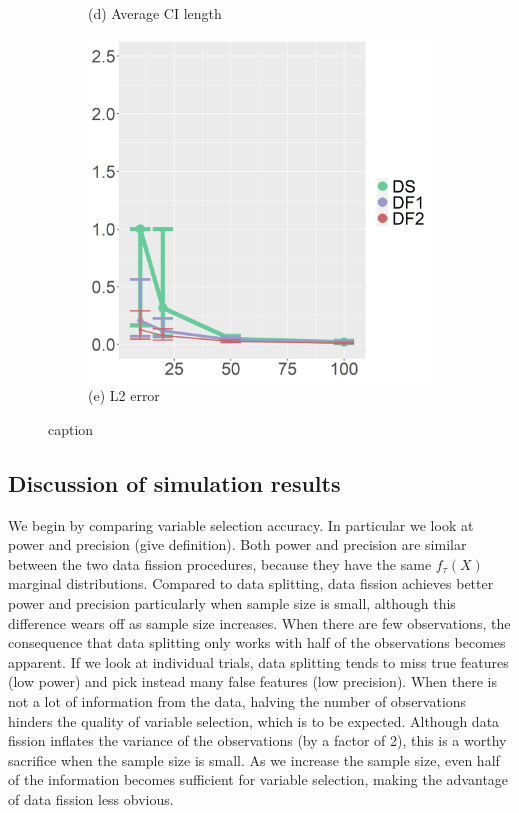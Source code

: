 \begin{figure}[ht!]
\begin{subfigure}[b]{.32\columnwidth}
    \caption{(d) Average CI length}
\end{subfigure}
\hfill
\centering
\begin{subfigure}[b]{.32\columnwidth} 
    \includegraphics[width=\columnwidth]{../../plot/L2_1.png}
    \caption{(e) L2 error}
\end{subfigure}
\hfill
\caption{caption}
\label{fig:median}
\end{figure}

\subsection{Discussion of simulation results}

We begin by comparing variable selection accuracy. In particular we look at power and precision (give definition). Both power and precision are similar between the two data fission procedures, because they have the same $f_\tau(X)$ marginal distributions. Compared to data splitting, data fission achieves better power and precision particularly when sample size is small, although this difference wears off as sample size increases. When there are few observations, the consequence that data splitting only works with half of the observations becomes apparent. If we look at individual trials, data splitting tends to miss true features (low power) and pick instead many false features (low precision). When there is not a lot of information from the data, halving the number of observations hinders the quality of variable selection, which is to be expected. Although data fission inflates the variance of the observations (by a factor of 2), this is a worthy sacrifice when the sample size is small. As we increase the sample size, even half of the information becomes sufficient for variable selection, making the advantage of data fission less obvious.

